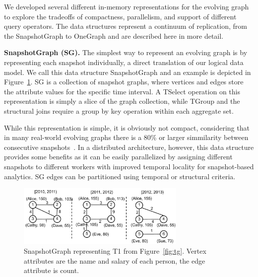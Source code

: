 We developed several different in-memory representations for the
evolving graph to explore the tradeoffs of compactness, parallelism,
and support of different query operators.  The data structures
represent a continuum of replication, from the SnapshotGraph to
OneGraph and are described here in more detail.

{\bf SnapshotGraph (SG).} The simplest way to represent an evolving
graph is by representing each snapshot individually, a direct
translation of our logical data model.  We call this data structure
SnapshotGraph and an example is depicted in Figure~\ref{fig:sgp}.
SG is a collection of snapshot graphs, where vertices and
edges store the attribute values for the specific time interval.  A
TSelect operation on this representation is simply a slice of the
graph collection, while TGroup and the structural joins require a
group by key operation within each aggregate set.

While this representation is simple, it is obviously not compact,
considering that in many real-world evolving graphs there is a 80\% or
larger simmilarity between consecutive
snapshots~\cite{DBLP:journals/tos/MiaoHLWYZPCC15}.  In a distributed
architecture, however, this data structure provides some
benefits as it can be easily parallelized by assigning different
snapshots to different workers with improved temporal locality for
snapshot-based analytics.  SG edges can be partitioned
using temporal or structural criteria.  

\begin{figure}[t!]
\includegraphics[width=3.2in]{figs/sgp.pdf}
\caption{SnapshotGraph representing T1 from
  Figure~\ref{fig:tg}.  Vertex attributes are the name and salary of
  each person, the edge attribute is count.}
\label{fig:sgp}
\end{figure}

